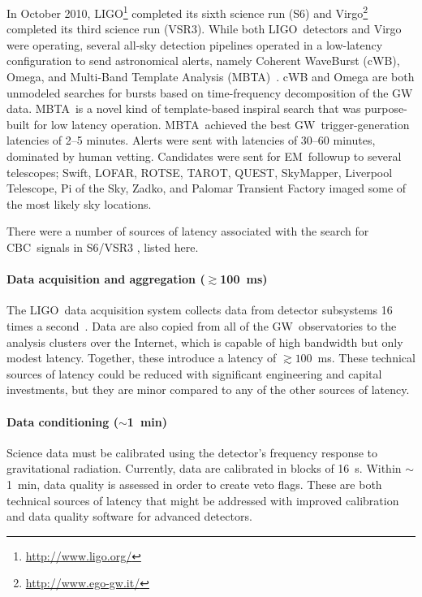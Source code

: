 \documentclass[preprint2]{aastex}
\newcommand{\mbta}{MBTA}
\newcommand{\GW}{GW}%
\newcommand{\EM}{EM}%
\newcommand{\CBC}{CBC}%
\newcommand{\LIGO}{LIGO}%
\begin{document}
In October 2010, \LIGO{}\footnote{\url{http://www.ligo.org/}} completed its
sixth science run (S6) and Virgo\footnote{\url{http://www.ego-gw.it/}}
completed its third science run (VSR3).  While both \LIGO\ detectors and Virgo
were operating, several all-sky detection pipelines operated in a low-latency
configuration to send astronomical alerts, namely Coherent WaveBurst (cWB), Omega, and Multi-Band Template Analysis (\mbta)~\citep{HugheyGWPAW2011, S6lowlatency2, S6lowlatency3, S6lowlatency4}.  cWB and Omega are both unmodeled searches for bursts based on time-frequency decomposition of the GW data.  \mbta\ is a novel kind of template-based inspiral search that was purpose-built for low latency operation.  \mbta\ achieved the best \GW\ trigger-generation latencies of 2--5 minutes.
Alerts were sent with latencies of 30--60 minutes, dominated by human vetting.
Candidates were sent for \EM\ followup to several telescopes; Swift,
LOFAR, ROTSE, TAROT, QUEST, SkyMapper,
Liverpool Telescope, Pi of the Sky, Zadko, and Palomar Transient Factory
\citep{kanner2008, HugheyGWPAW2011} imaged some of the most likely sky
locations.

There were a number of sources of latency associated with the search for
\CBC\ signals in S6/VSR3 \citep{HugheyGWPAW2011}, listed here.

\paragraph{Data acquisition and aggregation ($\gtrsim$100~ms)}%
The \LIGO\ data acquisition system collects data from detector subsystems 16
times a second~\citep{Bork2001}. Data are also copied from all of the \GW\
observatories to the analysis clusters over the Internet, which is capable of
high bandwidth but only modest latency.  Together, these introduce a latency of
$\gtrsim$$100$~ms.  These technical sources of latency could be reduced with
significant engineering and capital investments, but they are minor compared
to any of the other sources of latency.

\paragraph{Data conditioning ($\sim$1~min)}%
Science data must be calibrated using the detector's frequency response to
gravitational radiation.  Currently, data are calibrated in blocks of 16~s.
Within $\sim$1~min, data quality is assessed in order to create veto flags.
These are both technical sources of latency that might be addressed with
improved calibration and data quality software for advanced detectors.
\end{document}
